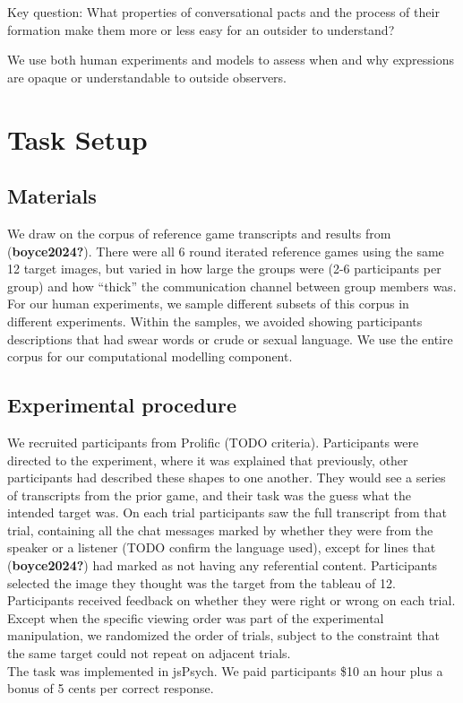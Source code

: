 \documentclass[10pt, letterpaper]{article}
\begin{document}
Key question: What properties of conversational pacts and the process of
their formation make them more or less easy for an outsider to
understand?

We use both human experiments and models to assess when and why
expressions are opaque or understandable to outside observers.

\section{Task Setup}\label{task-setup}

\subsection{Materials}\label{materials}

We draw on the corpus of reference game transcripts and results from
(\textbf{boyce2024?}). There were all 6 round iterated reference games
using the same 12 target images, but varied in how large the groups were
(2-6 participants per group) and how ``thick'' the communication channel
between group members was. For our human experiments, we sample
different subsets of this corpus in different experiments. Within the
samples, we avoided showing participants descriptions that had swear
words or crude or sexual language. We use the entire corpus for our
computational modelling component.

\subsection{Experimental procedure}\label{experimental-procedure}

We recruited participants from Prolific (TODO criteria). Participants
were directed to the experiment, where it was explained that previously,
other participants had described these shapes to one another. They would
see a series of transcripts from the prior game, and their task was the
guess what the intended target was. On each trial participants saw the
full transcript from that trial, containing all the chat messages marked
by whether they were from the speaker or a listener (TODO confirm the
language used), except for lines that (\textbf{boyce2024?}) had marked
as not having any referential content. Participants selected the image
they thought was the target from the tableau of 12. Participants
received feedback on whether they were right or wrong on each trial.
Except when the specific viewing order was part of the experimental
manipulation, we randomized the order of trials, subject to the
constraint that the same target could not repeat on adjacent trials.\\
The task was implemented in jsPsych. We paid participants \$10 an hour
plus a bonus of 5 cents per correct response.
\end{document}

